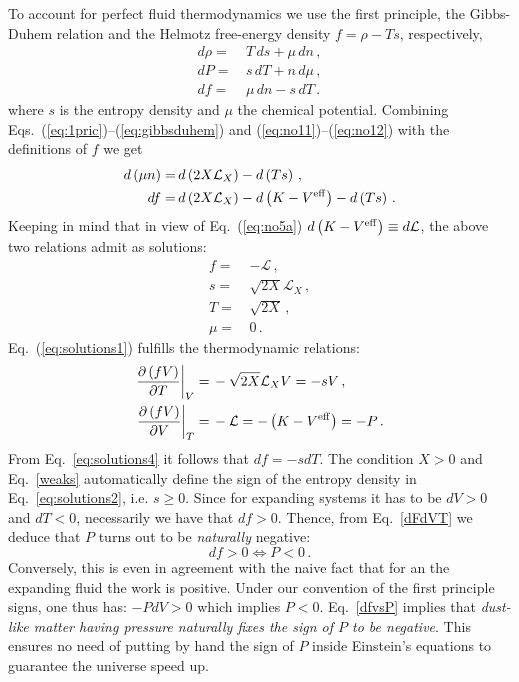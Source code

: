 \documentclass[twocolumn,showpacs, nofootinbib,aps,superscriptaddress, eqsecnum,prd,prl,notitlepage,showkeys,10pt,reprint]{revtex4-1}
\begin{document}
To account for perfect fluid thermodynamics we use the first principle, the Gibbs-Duhem relation and the Helmotz free-energy density $f=\rho-Ts$, respectively,
%
\begin{align}
\label{eq:1pric}
d\rho =\,& T\,ds+\mu\,dn\,, \\
\label{eq:gibbsduhem}
dP =\,& s\,dT +n\,d\mu\,,\\
\label{eq:dhelmotz}
df =\,& \mu\,dn - s\,dT\,.
\end{align}
%
where $s$ is the entropy density and $\mu$ the chemical potential.
Combining Eqs.~(\ref{eq:1pric})--(\ref{eq:gibbsduhem}) and (\ref{eq:no11})--(\ref{eq:no12}) with the definitions of $f$ we get
%
\begin{align}
\label{eq:solutions11}
d\left(\mu n\right) =&\, d\left(2X\mathcal{L}_X\right) - d\left(Ts\right)\,,\\
\label{eq:solutions22}
df =&\, d\left(2X\mathcal{L}_X\right) - d\left(K-V^{\rm eff}\right) - d\left(Ts\right)\,.
\end{align}
%
Keeping in mind that in view of Eq.~(\ref{eq:no5a}) $d\left(K-V^{\rm eff}\right)\equiv d\mathcal{L}$, the above two relations admit as solutions:
%
\begin{align}
\label{eq:solutions1}
f =\,& -\mathcal{L}\,,\\
\label{eq:solutions2}
s=\,&\sqrt{2X}\mathcal{L}_X\,,\\
\label{eq:solutions3}
T=\,&\sqrt{2X}\,,\\
\label{eq:solutions4}
\mu=\,&0\,.
\end{align}
%
Eq.~(\ref{eq:solutions1}) fulfills the thermodynamic relations:
%
\begin{align}
\label{dFdTV}
\frac{\partial\left(fV\right)}{\partial T}\bigg\rvert_V =\,& -\sqrt{2X} \mathcal{L}_X V = -sV\,,\\
\label{dFdVT}
\frac{\partial\left(fV\right)}{\partial V}\bigg\rvert_T =\,& -\mathcal{L}= -\left(K-V^{\rm eff}\right) = -P\,.
\end{align}
%
From Eq.~\eqref{eq:solutions4} it follows that $df=-sdT$.
The condition $X>0$ and Eq.~\eqref{weaks} automatically define the sign of the entropy density in Eq.~\eqref{eq:solutions2}, i.e. $s\geq0$. Since for expanding systems it has to be $dV>0$ and $dT<0$, necessarily we have that $df>0$. Thence, from Eq.~\eqref{dFdVT} we deduce that $P$ turns out to be \emph{naturally} negative:
%
\begin{equation}
\label{dfvsP}
 df>0\Leftrightarrow P<0\,.
\end{equation}
%
Conversely, this is even in agreement with the naive fact that for an the expanding fluid the work is positive. Under our convention of the first principle signs, one thus has: $-PdV>0$ which implies $P<0$.
Eq.~\eqref{dfvsP} implies that \emph{dust-like matter having pressure naturally fixes the sign of $P$ to be negative}. This ensures no need of putting by hand the sign of $P$ inside Einstein's equations to guarantee the universe speed up.
\end{document}
